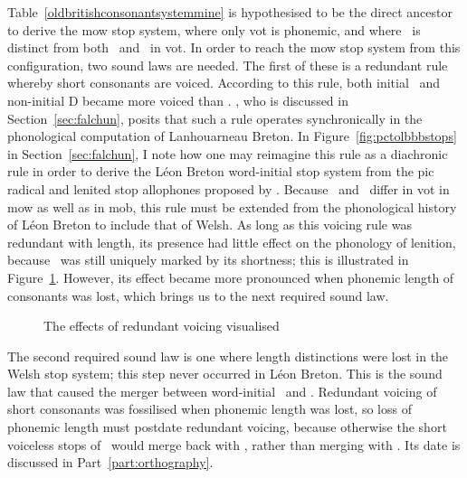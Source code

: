 Table~\ref{oldbritishconsonantsystemmine} is hypothesised to be the direct ancestor to derive the \gls{mow} stop system, where only \gls{vot} is phonemic, and where \xT\ is distinct from both \lT\ and \xD\ in \gls{vot}. In order to reach the \gls{mow} stop system from this configuration, two sound laws are needed. The first of these is a redundant rule whereby short consonants are voiced. According to this rule, both initial \lT\ and non-initial \gls{D} became more voiced than \xT. \Textcite{carlyle_syllabic_1988}, who is discussed in Section~\ref{sec:falchun}, posits that such a rule operates synchronically in the phonological computation of Lanhouarneau Breton. In Figure~\ref{fig:pctolbbbstops} in Section~\ref{sec:falchun}, I note how one may reimagine this rule as a diachronic rule in order to derive the Léon Breton word-initial stop system from the \gls{pic} radical and lenited stop allophones proposed by \textcite{harvey_aspects_1984}. Because \xT\ and \lT\ differ in \gls{vot} in \gls{mow} as well as in \gls{mob}, this rule must be extended from  the phonological history of Léon Breton to include that of Welsh. As long as this voicing rule was redundant with length, its presence had little effect on the phonology of lenition, because \lT\ was still uniquely marked by its shortness; this is illustrated in Figure~\ref{fig:redvoicvis}. However, its effect became more pronounced when phonemic length of consonants was lost, which brings us to the next required sound law.

\begin{figure}[h]
  \centering
  \caption{The effects of redundant voicing  visualised}
  \label{fig:redvoicvis}
\end{figure}

The second required sound law is one where length distinctions were lost in the Welsh stop system; this step never occurred in Léon Breton. This is the sound law that caused the merger between word-initial \xD\ and \lT. Redundant voicing of short consonants was fossilised when phonemic length was lost, so loss of phonemic length must postdate redundant voicing, because otherwise the short voiceless stops of \lT\ would merge back with \xT, rather than merging with \xD. Its date is discussed in Part~\ref{part:orthography}.


